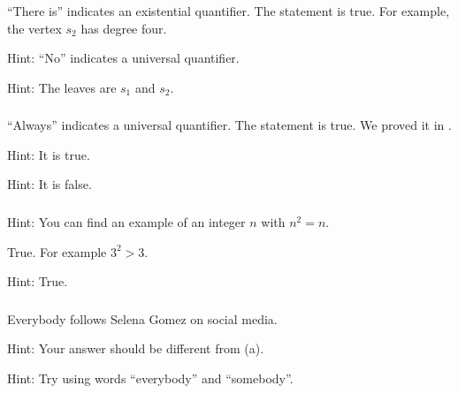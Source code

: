 \subsubsection*{ \answers}
\begin{apart}
    \item ``There is'' indicates an existential quantifier. The statement is true.  For example, the vertex $s_2$ has degree four.
    \item Hint: ``No'' indicates a universal quantifier.
    \item Hint: The leaves are $s_1$ and $s_2$.
\end{apart}

\subsubsection*{ \answers}
\begin{apart}
    \item ``Always'' indicates a universal quantifier.  The statement is true.  We proved it in .
    \item Hint: It is true.
    \item Hint: It is false.
\end{apart}

\subsubsection*{ \answers}
\begin{apart}
    \item Hint: You can find an example of an integer $n$ with $n^2=n$.
    \item True.  For example $3^2>3$.
    \item Hint: True.
\end{apart}

\subsubsection*{ \answers}
\begin{apart}
    \item Everybody follows Selena Gomez on social media.
    \item Hint: Your answer should be different from (a).
    \item Hint: Try using words ``everybody'' and ``somebody''.
\end{apart}

